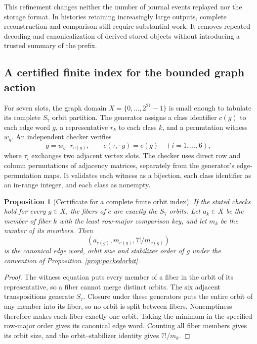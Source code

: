 \documentclass[11pt,a4paper]{article}
\newtheorem{proposition}[theorem]{Proposition}
\theoremstyle{definition}\newtheorem{definition}[theorem]{Definition}
\begin{document}
This refinement changes neither the number of journal events replayed nor the storage format. In histories retaining increasingly large outputs, complete reconstruction and comparison still require substantial work. It removes repeated decoding and canonicalization of derived stored objects without introducing a trusted summary of the prefix.

\subsection{A certified finite index for the bounded graph action}\label{sec:graphindex}
For seven slots, the graph domain $X=\{0,\ldots,2^{21}-1\}$ is small enough to tabulate its complete $S_7$ orbit partition. The generator assigns a class identifier $c(g)$ to each edge word $g$, a representative $r_k$ to each class $k$, and a permutation witness $w_g$. An independent checker verifies
\begin{equation}\label{eq:indexcertificate}
 g=w_g\mathbin{\cdot}r_{c(g)},\qquad
 c(\tau_i\mathbin{\cdot}g)=c(g)\quad(i=1,\ldots,6),
\end{equation}
where $\tau_i$ exchanges two adjacent vertex slots. The checker uses direct row and column permutations of adjacency matrices, separately from the generator's edge-permutation maps. It validates each witness as a bijection, each class identifier as an in-range integer, and each class as nonempty.

\begin{proposition}[Certificate for a complete finite orbit index]\label{prop:graphindex}
If the stated checks hold for every $g\in X$, the fibers of $c$ are exactly the $S_7$ orbits. Let $a_k\in X$ be the member of fiber $k$ with the least row-major comparison key, and let $m_k$ be the number of its members. Then
\[
 (a_{c(g)},m_{c(g)},7!/m_{c(g)})
\]
is the canonical edge word, orbit size and stabilizer order of $g$ under the convention of Proposition~\ref{prop:packedorbit}.
\end{proposition}
\begin{proof}
The witness equation puts every member of a fiber in the orbit of its representative, so a fiber cannot merge distinct orbits. The six adjacent transpositions generate $S_7$. Closure under these generators puts the entire orbit of any member into its fiber, so no orbit is split between fibers. Nonemptiness therefore makes each fiber exactly one orbit. Taking the minimum in the specified row-major order gives its canonical edge word. Counting all fiber members gives its orbit size, and the orbit--stabilizer identity gives $7!/m_k$.
\end{proof}
\end{document}
